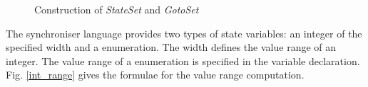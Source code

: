 \begin{figure}[h!]
\noindent{}
\caption{Construction of \emph{StateSet} and \emph{GotoSet}\label{goto_check}}
\end{figure}





The synchroniser language provides two types of state variables: an integer of the specified width and a enumeration. The width defines the value range of an integer. The value range of a enumeration is specified in the variable declaration. Fig. \ref{int_range} gives the formulae for the value range computation.

